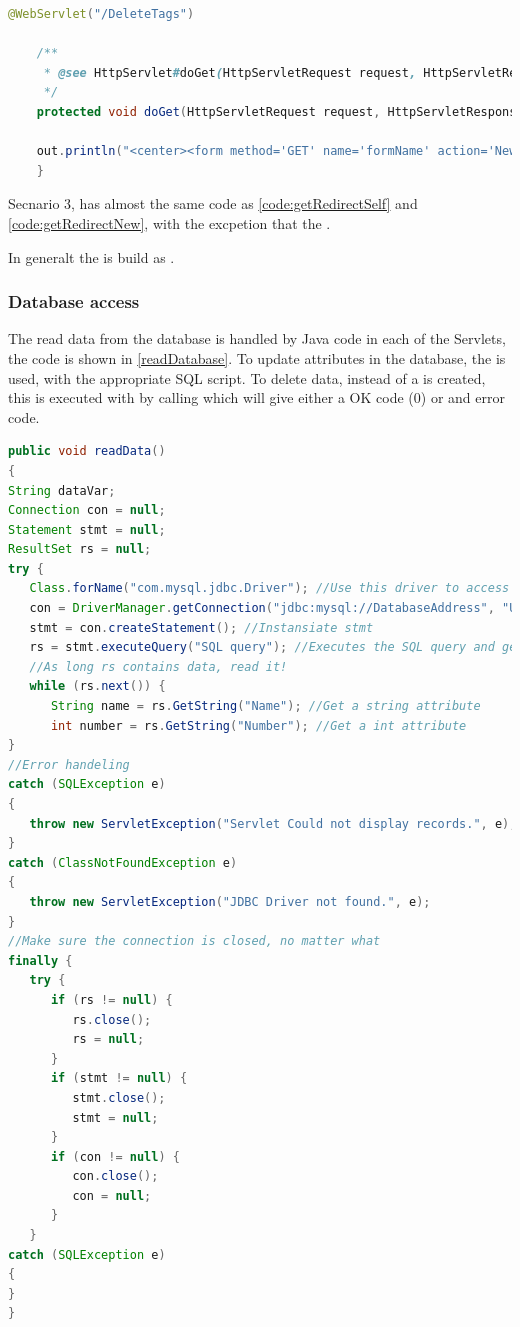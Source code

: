 \begin{lstlisting}[language=Java,label=code:getRedirectNew,caption=A form which redirect to its own get method]
	@WebServlet("/DeleteTags")
	
	/**
	 * @see HttpServlet#doGet(HttpServletRequest request, HttpServletResponse response)
	 */
	protected void doGet(HttpServletRequest request, HttpServletResponse response) throws ServletException, IOException {
	
	out.println("<center><form method='GET' name='formName' action='NewPage'>");
	}
\end{lstlisting}

Secnario 3, has almost the same code as \autoref{code:getRedirectSelf} and \autoref{code:getRedirectNew}, with the excpetion that the .

In generalt the  is build as .

\subsubsection{Database access}
The read data from the database is handled by Java code in each of the Servlets, the code is shown in \autoref{readDatabase}. To update attributes in the database, the  is used, with the appropriate SQL script.  To delete data, instead of  a  is created, this is executed with by calling  which will give either a OK code (0) or and error code. 

\begin{lstlisting}[language=Java,label=code:readDatabase,caption=Code to read data from the database]
public void readData()
{
String dataVar;
Connection con = null;
Statement stmt = null;
ResultSet rs = null;
try {
   Class.forName("com.mysql.jdbc.Driver"); //Use this driver to access the database
   con = DriverManager.getConnection("jdbc:mysql://DatabaseAddress", "Username", "Password"); //Instansiate the connection
   stmt = con.createStatement(); //Instansiate stmt
   rs = stmt.executeQuery("SQL query"); //Executes the SQL query and get the result store in RS
   //As long rs contains data, read it!
   while (rs.next()) { 
      String name = rs.GetString("Name"); //Get a string attribute
      int number = rs.GetString("Number"); //Get a int attribute
}
//Error handeling
catch (SQLException e) 
{		
   throw new ServletException("Servlet Could not display records.", e);
} 
catch (ClassNotFoundException e) 
{			
   throw new ServletException("JDBC Driver not found.", e);
}
//Make sure the connection is closed, no matter what 
finally {
   try {
      if (rs != null) {
         rs.close();
         rs = null;
      }
      if (stmt != null) {
         stmt.close();
         stmt = null;
      }
      if (con != null) {
         con.close();
         con = null;
      }
   } 
catch (SQLException e) 
{			
}
}

\end{lstlisting}

